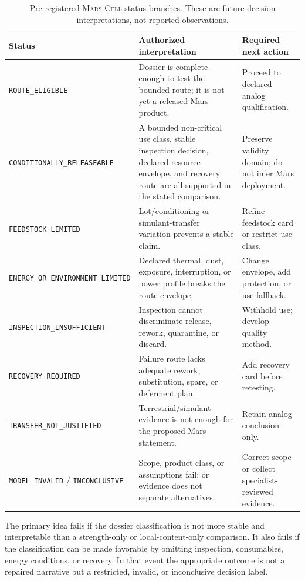 \documentclass[conference]{../../../../Conference-LaTeX-template_10-17-19/IEEEtran}
\newcommand{\marscell}{\textsc{Mars-Cell}}
\begin{document}
\begin{table}[!t]
\caption{Pre-registered \marscell{} status branches. These are future decision interpretations, not reported observations.}
\label{tab:status}
\centering
\small
\begin{tabularx}{\textwidth}{lY Y}
\toprule
Status & Authorized interpretation & Required next action \\
\midrule
\texttt{ROUTE\_ELIGIBLE} & Dossier is complete enough to test the bounded route; it is not yet a released Mars product. & Proceed to declared analog qualification. \\
\texttt{CONDITIONALLY\_RELEASEABLE} & A bounded non-critical use class, stable inspection decision, declared resource envelope, and recovery route are all supported in the stated comparison. & Preserve validity domain; do not infer Mars deployment. \\
\texttt{FEEDSTOCK\_LIMITED} & Lot/conditioning or simulant-transfer variation prevents a stable claim. & Refine feedstock card or restrict use class. \\
\texttt{ENERGY\_OR\_ENVIRONMENT\_LIMITED} & Declared thermal, dust, exposure, interruption, or power profile breaks the route envelope. & Change envelope, add protection, or use fallback. \\
\texttt{INSPECTION\_INSUFFICIENT} & Inspection cannot discriminate release, rework, quarantine, or discard. & Withhold use; develop quality method. \\
\texttt{RECOVERY\_REQUIRED} & Failure route lacks adequate rework, substitution, spare, or deferment plan. & Add recovery card before retesting. \\
\texttt{TRANSFER\_NOT\_JUSTIFIED} & Terrestrial/simulant evidence is not enough for the proposed Mars statement. & Retain analog conclusion only. \\
\texttt{MODEL\_INVALID} / \texttt{INCONCLUSIVE} & Scope, product class, or assumptions fail; or evidence does not separate alternatives. & Correct scope or collect specialist-reviewed evidence. \\
\bottomrule
\end{tabularx}
\end{table}

The primary idea fails if the dossier classification is not more stable and interpretable than a strength-only or local-content-only comparison. It also fails if the classification can be made favorable by omitting inspection, consumables, energy conditions, or recovery. In that event the appropriate outcome is not a repaired narrative but a restricted, invalid, or inconclusive decision label.
\end{document}
